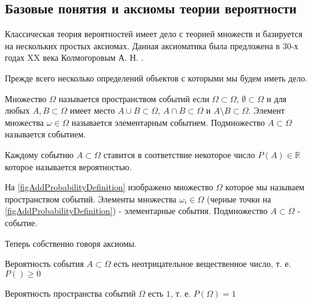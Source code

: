 \subsection{Базовые понятия и аксиомы теории вероятности}

Классическая теория вероятностей имеет дело с теорией множеств и
базируется на нескольких простых аксиомах. Данная аксиоматика была
предложена в 30-х годах XX века Колмогоровым
А. Н. \cite{bKolmogorov74basic}. 

Прежде всего несколько определений объектов с которыми мы будем иметь
дело. 

\begin{definition}
  Множество $\Omega$ называется пространством событий если
  $\Omega \subset \Omega$, $\emptyset \subset \Omega$ и для любых
  $A,B \subset \Omega$ имеет место
  $A \cup B \subset \Omega$, $A \cap B \subset \Omega$ и
  $A \setminus B \subset \Omega$.  Элемент множества
  $\omega \in \Omega$ называется элементарным событием. Подмножество 
  $A \subset \Omega$ называется событием.
\end{definition}

\begin{definition}
  Каждому событию $A \subset \Omega$ ставится в соответствие некоторое
  число $P\left(A\right) \in \mathbb{R}$ которое называется вероятностью.
\end{definition}

\begin{example}

На \autoref{figAddProbabilityDefinition} изображено множество
$\Omega$ которое мы называем пространством событий. Элементы
множества $\omega_i \in \Omega$ (черные точки на
\autoref{figAddProbabilityDefinition}) - элементарные
события. Подмножество $A \subset \Omega$ - событие.
\end{example}

Теперь собственно говоря аксиомы.

\begin{axiom}[Не-отрицательность]
  \label{axProbabilityKolmogorovNonNegativity}
  Вероятность события $A \subset \Omega$ есть неотрицательное
  вещественное число, т. е. $P\left(\right) \ge 0$
\end{axiom}

\begin{axiom}[Нормировка]
  \label{axProbabilityNormalization}
  Вероятность пространства событий $\Omega$ есть $1$, т. е.
  $P\left(\Omega\right) = 1$
\end{axiom}


